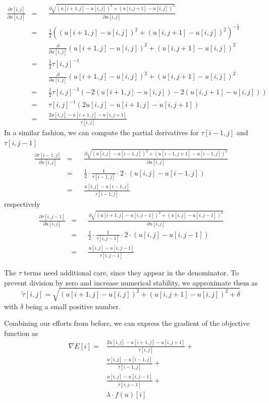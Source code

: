 \documentclass{paper}
\begin{document}
\begin{align}
\frac{\partial \tau[i,j]}{\partial u[i,j]} 
&= &&\frac{\partial \sqrt{(u[i+1,j] - u[i,j])^2 + (u[i, j+1] - u[i, j])^2}}{\partial u[i,j]} \\
&= &&\frac{1}{2} ((u[i+1,j] - u[i,j])^2 + (u[i, j+1] - u[i, j])^2)^{-\frac{1}{2}} \\
& &&\frac{\partial}{\partial u[i,j]} 
(u[i+1,j] - u[i,j])^2 + (u[i, j+1] - u[i, j])^2 \\
&= &&\frac{1}{2}\tau[i,j]^{-1} \\
& &&\frac{\partial}{\partial u[i,j]} 
(u[i+1,j] - u[i,j])^2 + (u[i, j+1] - u[i, j])^2 \\
&= &&\frac{1}{2}\tau[i,j]^{-1}
(-2(u[i + 1, j] - u[i,j]) - 2(u[i, j+1] - u[i,j])) \\
&= &&\tau[i,j]^{-1} (2 u[i,j] -u[i + 1, j] - u[i, j+1]) \\
&= &&\frac{2u[i,j] - u[i + 1, j] - u[i, j+1]}{\tau[i,j]}
\end{align}
In a similar fashion, we can compute the partial derivatives for
$\tau[i-1, j]$ and $\tau[i, j - 1]$
\begin{align}
\frac{\partial \tau[i - 1,j]}{\partial u[i,j]} 
&= &&\frac{\partial \sqrt{(u[i,j] - u[i-1,j])^2 + (u[i-1, j+1] - u[i-1, j])^2}}{\partial u[i,j]} \\
&= &&\frac{1}{2} \cdot \frac{1}{\tau[i - 1, j]} \cdot 2 \cdot (u[i,j] - u[i-1, j]) \\
&= &&\frac{u[i,j] - u[i-1, j]}{\tau[i - 1, j]}
\end{align}
respectively
\begin{align}
\frac{\partial \tau[i,j-1]}{\partial u[i,j]} 
&= &&\frac{\partial \sqrt{(u[i + 1 ,j] - u[i,j - 1])^2 + (u[i, j] - u[i, j - 1])^2}}{\partial u[i,j]} \\
&= &&\frac{1}{2} \cdot \frac{1}{\tau[i, j - 1]} \cdot 2 \cdot (u[i,j] - u[i, j-1]) \\
&= &&\frac{u[i,j] - u[i, j - 1]}{\tau[i, j-1]}
\end{align}

The $\tau$ terms need additional care, since they appear in the denominator. To prevent division by zero and increase numerical 
stability, we approximate them as 
\begin{equation}
\tilde{\tau}[i,j] = \sqrt{(u[i+1,j] - u[i,j])^2 + (u[i, j+1] - u[i, j])^2 + \delta}
\end{equation}
with $\delta$ being a small positive number.

Combining our efforts from before, we can express the gradient of the objective function as
\begin{align}
\nabla E[i] = &\frac{2u[i,j] - u[i + 1, j] - u[i, j+1]}{\tau[i,j]} + \\
	&\frac{u[i,j] - u[i - 1, j]}{\tilde{\tau}[i - 1, j]} + \\
	&\frac{u[i,j] - u[i, j - 1]}{\tilde{\tau}[i, j-1]} + \\
	&\lambda \cdot f(u)[i]
\end{align}
\end{document}
